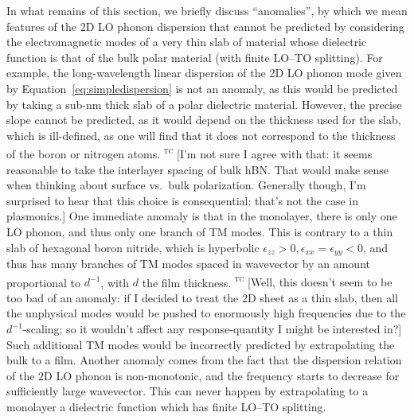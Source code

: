 \documentclass[aps,prb,twocolumn,
	           groupedaddress,superscriptaddress,
               amsfonts,amssymb,amsmath,floatfix,
	           citeautoscript]{revtex4-1}
\newcommand{\comment}[2]{%
    \ifbool{togglecomments}%
    {\textcolor{blue!70!black}{\small\textsf{%
    \textsuperscript{\textsc{\textsf{\MakeLowercase{#1}}}}%
    [#2]}}} %
    {}}     %
\begin{document}
In what remains of this section, we  briefly discuss ``anomalies'', by which we mean features of the 2D LO phonon dispersion that cannot be predicted by considering the electromagnetic modes of a very thin slab of material whose dielectric function is that of the bulk polar material (with finite LO--TO splitting). For example, the long-wavelength linear dispersion of the 2D LO phonon mode given by Equation~\eqref{eq:simpledispersion} is not an anomaly, as this would be predicted by taking a sub-nm thick slab of a polar dielectric material. However, the precise slope cannot be predicted, as it would depend on the thickness used for the slab, which is ill-defined, as one will find that it does not correspond to the thickness of the boron or nitrogen atoms. 
\comment{tc}{I'm not sure I agree with that: it seems reasonable to take the interlayer spacing of bulk hBN. That would make sense when thinking about surface vs.\ bulk polarization. Generally though, I'm surprised to hear that this choice is consequential: that's not the case in plasmonics.}
One immediate anomaly is that in the monolayer, there is only one LO phonon, and thus only one branch of TM modes. This is contrary to a thin slab of hexagonal boron nitride, which is hyperbolic $\epsilon_{zz} > 0, \epsilon_{xx} = \epsilon_{yy} < 0$, and thus has many branches of TM modes spaced in wavevector by an amount proportional to $d^{-1}$, with $d$ the film thickness.
\comment{tc}{Well, this doesn't seem to be too bad of an anomaly: if I decided to treat the 2D sheet as a thin slab, then all the unphysical modes would be pushed to enormously high frequencies due to the $d^{-1}$-scaling; so it wouldn't affect any response-quantity I might be interested in?}
Such additional TM modes would be incorrectly predicted by extrapolating the bulk to a film. Another anomaly comes from the fact that the dispersion relation of the 2D LO phonon is non-monotonic, and the frequency starts to decrease for sufficiently large wavevector. This can never happen by extrapolating to a monolayer a dielectric function which has finite LO--TO splitting. 
\end{document}
